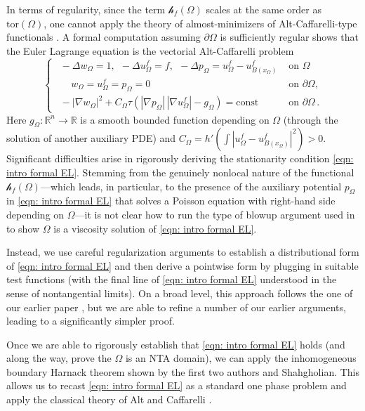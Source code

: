 \documentclass[10pt,a4paper]{amsart}
\numberwithin{equation}{section}
\def\R{{\mathbb R}}
\def\W{\Omega}
\def\tor{\mathrm{tor}}
\def\nl{\mathscr{h}_f}
\def\na{\nabla}
\begin{document}
In terms of regularity, since the term $\nl(\W)$ scales at the same order as $\tor(\W)$, one cannot apply the theory of almost-minimizers  of Alt-Caffarelli-type functionals \cite{DET}. A formal  computation  assuming $\partial \W$ is sufficiently regular shows that the Euler Lagrange equation is the vectorial Alt-Caffarelli problem
\begin{equation}
    \label{eqn: intro formal EL}
    \begin{cases}
\ \        -\Delta w_\W = 1, \ \  -\Delta u_\W^f = f, \ \ -\Delta p_\W = u_\W^f -u_{B(x_\W)}^f & \text{ on } \Omega\\
    \ \  \ \ \ \  \  w_\W = u_\W^f = p_\W = 0 & \text{ on } \partial \W,\\
       \ \  -|\na w_\W|^2 + C_\W \tau ( |\nabla p_\W| \, |\nabla u_\W^f| - g_\W)  = \text{const} & \text{ on }\partial \W\,.
    \end{cases}
\end{equation}
Here $g_\W:\R^n \to \R$ is a smooth bounded function depending on $\W$ (through the solution of another auxiliary PDE) and  $C_\W = h'(\int |u_\W^f - u_{B(x_\W)}^f|^2)>0$.
Significant difficulties arise in rigorously deriving the stationarity condition \eqref{eqn: intro formal EL}. Stemming from the genuinely nonlocal nature of the functional $\nl(\W)$---which leads, in particular, to the presence of the auxiliary potential $p_\W$ in \eqref{eqn: intro formal EL} that solves a Poisson equation with right-hand side depending on $\W$---it is not clear how to run the type of blowup argument used in \cite{blnp23} to show $\W$ is a viscosity solution of \eqref{eqn: intro formal EL}. 

Instead, we use careful regularization arguments to establish a distributional form of \eqref{eqn: intro formal EL} and then derive a pointwise form by plugging in suitable test functions (with the final line of \eqref{eqn: intro formal EL} understood in the sense of nontangential limits). On a broad level, this approach follows the one of our earlier paper \cite{AKN2}, but we are able to refine a number of our earlier arguments, leading to a significantly simpler proof.


Once we are able to rigorously establish that \eqref{eqn: intro formal EL} holds (and along the way, prove the $\W$ is an NTA domain), we can apply the inhomogeneous boundary Harnack theorem \cite{aks23} shown by the first two authors and Shahgholian. This allows us to recast \eqref{eqn: intro formal EL} as a standard one phase problem and apply the classical theory of Alt and Caffarelli \cite{AC81}.
\end{document}
